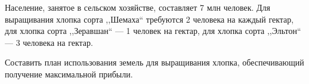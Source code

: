 Население, занятое в сельском хозяйстве, составляет 7 млн человек. Для выращивания хлопка сорта ,,Шемаха`` требуются 2 человека на каждый гектар, для хлопка сорта ,,Зеравшан`` --- 1 человек на гектар, для хлопка сорта ,,Эльтон`` --- 3 человека на гектар.

Составить план использования земель для выращивания хлопка, обеспечивающий получение максимальной прибыли.

\pagebreak
